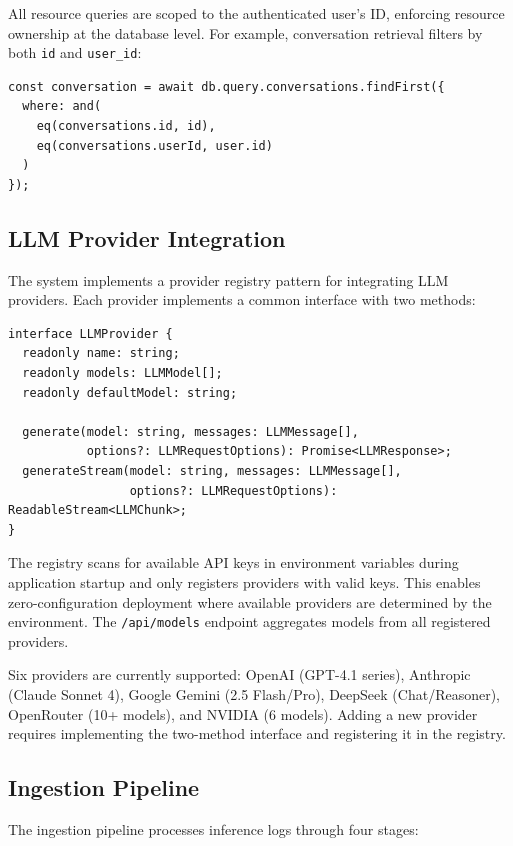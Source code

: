 \documentclass[conference]{IEEEtran}
\begin{document}
All resource queries are scoped to the authenticated user's ID, enforcing resource ownership at the database level. For example, conversation retrieval filters by both \texttt{id} and \texttt{user\_id}:

\begin{lstlisting}[caption=Resource ownership enforcement]
const conversation = await db.query.conversations.findFirst({
  where: and(
    eq(conversations.id, id),
    eq(conversations.userId, user.id)
  )
});
\end{lstlisting}

\subsection{LLM Provider Integration}

The system implements a provider registry pattern for integrating LLM providers. Each provider implements a common interface with two methods:

\begin{lstlisting}[caption=LLM Provider interface]
interface LLMProvider {
  readonly name: string;
  readonly models: LLMModel[];
  readonly defaultModel: string;

  generate(model: string, messages: LLMMessage[],
           options?: LLMRequestOptions): Promise<LLMResponse>;
  generateStream(model: string, messages: LLMMessage[],
                 options?: LLMRequestOptions): ReadableStream<LLMChunk>;
}
\end{lstlisting}

The registry scans for available API keys in environment variables during application startup and only registers providers with valid keys. This enables zero-configuration deployment where available providers are determined by the environment. The \texttt{/api/models} endpoint aggregates models from all registered providers.

Six providers are currently supported: OpenAI (GPT-4.1 series), Anthropic (Claude Sonnet 4), Google Gemini (2.5 Flash/Pro), DeepSeek (Chat/Reasoner), OpenRouter (10+ models), and NVIDIA (6 models). Adding a new provider requires implementing the two-method interface and registering it in the registry.

\subsection{Ingestion Pipeline}

The ingestion pipeline processes inference logs through four stages:
\end{document}
